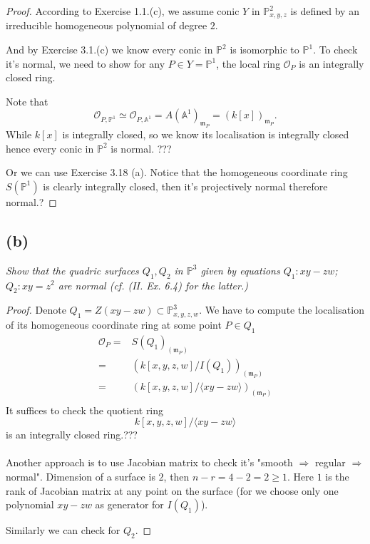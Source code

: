 \begin{proof}
According to Exercise 1.1.(c), we assume conic $Y$ in $\mathbb P^2_{x,y,z}$ is defined by an irreducible homogeneous polynomial of degree $2$. 

And by Exercise 3.1.(c) we know every conic in $\mathbb P^2$ is isomorphic to $\mathbb P^1$. To check it's normal, we need to show for any $P\in Y=\mathbb P^1$, the local ring $\mathscr O_P$ is an integrally closed ring. 

Note that
\[\mathscr O_{P,\mathbb P^1}\simeq \mathscr O_{P,\mathbb A^1}=A(\mathbb A^1)_{\mathfrak m_P}=(k[x])_{\mathfrak m_P}.\] While $k[x]$ is integrally closed, so we know its localisation is integrally closed hence every conic in $\mathbb P^2$ is normal. ???

Or we can use Exercise 3.18 (a). Notice that the homogeneous coordinate ring $S(\mathbb P^1)$ is clearly integrally closed, then it's projectively normal therefore normal.?

\end{proof}

\subsection{(b)}
\textit{Show that the quadric surfaces $Q_1,Q_2$ in $\mathbb P^3$ given by equations $Q_1: xy-zw$; $Q_2:xy=z^2$ are normal (cf. (II. Ex. 6.4) for the latter.)}

\begin{proof}
	Denote $Q_1=Z(xy-zw)\subset \mathbb P^3_{x,y,z,w}$. We have to compute the localisation of its homogeneous coordinate ring at some point $P\in Q_1$
	\begin{align*}
		\mathscr O_P =& S(Q_1)_{(\mathfrak m_P)}\\
		=& (k[x,y,z,w]/I(Q_1))_{(\mathfrak m_P)}\\
		=& (k[x,y,z,w]/\langle xy-zw\rangle)_{(\mathfrak m_P)}\\
	\end{align*}
	It suffices to check the quotient ring
	\[k[x,y,z,w]/\langle xy-zw\rangle \] is an integrally closed ring.???\\\\

	Another approach is to use Jacobian matrix to check it's "smooth $\Rightarrow$ regular $\Rightarrow$ normal". Dimension of a surface is $2$, then $n-r=4-2=2\geq 1$. Here $1$ is the rank of Jacobian matrix at any point on the surface (for we choose only one polynomial $xy-zw$ as generator for $I(Q_1)$). 

	Similarly we can check for $Q_2$.

\end{proof}

